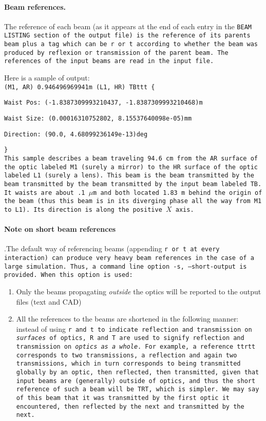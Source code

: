 \documentclass{article}
\begin{document}
\paragraph{Beam references.}The reference of each beam (as it appears at the end of each entry in the \tt{BEAM LISTING} section of the output file) is the reference of its parents beam plus a tag which can be \tt{r} or \tt{t} according to whether the beam was produced by reflexion or transmission of the parent beam. The references of the input beams are read in the input file.


Here is a sample of output:\\

\tt{(M1, AR) 0.946496969941m (L1, HR) TBttt \{}

	\quad	\tt{Waist Pos: (-1.8387309993210437, -1.8387309993210468)m}

	\quad	\tt{Waist Size: (0.00016310752802, 8.15537640098e-05)mm}

	\quad	\tt{Direction: (90.0, 4.68099236149e-13)deg}

	\tt{\}}\\

This sample describes a beam traveling 94.6~cm from the AR surface of the optic labeled M1 (surely a mirror) to the HR surface of the optic labeled L1 (surely a lens). This beam is the beam transmitted by the beam transmitted by the beam transmitted by the input beam labeled \tt{TB}. It waists are about .1~$\mu$m and both located 1.83~m behind the origin of the beam (thus this beam is in its diverging phase all the way from M1 to L1). Its direction is along the positive $X$ axis.

\paragraph{Note on short beam references}.The default way of referencing beams (appending \tt{r} or \tt{t} at every interaction) can produce very heavy beam references in the case of a large simulation. Thus, a command line option \tt{-s, --short-output} is provided. When this option is used:

\begin{enumerate}
\item Only the beams propagating \textit{outside} the optics will be reported to the output files (text and CAD)
\item All the references to the beams are shortened in the following manner: instead of using \tt{r} and \tt{t} to indicate reflection and transmission on \textit{surfaces} of optics, \tt{R} and \tt{T} are used to signify reflection and transmission on \textit{optics as a whole}. For example, a reference \tt{ttrtt} corresponds to two transmissions, a reflection and again two transmissions, which in turn corresponds to being transmitted globally by an optic, then reflected, then transmitted, given that input beams are (generally) outside of optics, and thus the short reference of such a beam will be \tt{TRT}, which is simpler. We may say of this beam that it was transmitted by the first optic it encountered, then reflected by the next and transmitted by the next. 
\end{enumerate}
\end{document}
